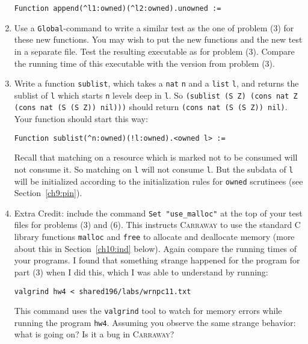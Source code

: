 \documentclass{book}[12pt]
\newcommand{\carraway}[0]{\textsc{Carraway}\xspace}
\begin{document}
\begin{enumerate}
\begin{verbatim}
Function append(^l1:owned)(^l2:owned).unowned :=
\end{verbatim}

\item Use a \texttt{Global}-command to write a similar test as the one
of problem (3) for these new functions.  You may wish to put the new
functions and the new test in a separate file.  Test the resulting
executable as for problem (3).  Compare the running time of this
executable with the version from problem (3).

\item Write a function \texttt{sublist}, which takes a \texttt{nat}
\texttt{n} and a \texttt{list} \texttt{l}, and returns the sublist of
\texttt{l} which starts \texttt{n} levels deep in \texttt{l}.  So
\texttt{(sublist (S Z) (cons nat Z (cons nat (S (S Z)) nil)))} should
return \texttt{(cons nat (S (S Z)) nil)}.  Your function should start
this way:

\begin{verbatim}
Function sublist(^n:owned)(!l:owned).<owned l> :=
\end{verbatim}

\noindent Recall that matching on a resource which is marked not to be
consumed will not consume it.  So matching on \texttt{l} will not
consume \texttt{l}.  But the subdata of \texttt{l} will be initialized
according to the initialization rules for \texttt{owned} scrutinees
(see Section~\ref{ch9:pin}).

\item Extra Credit: include the command \texttt{Set "use\_malloc"} at
the top of your test files for problems (3) and (6).  This instructs
\carraway to use the standard C library functions \texttt{malloc} and
\texttt{free} to allocate and deallocate memory (more about this in
Section~\ref{ch10:ind} below).  Again compare the running times of your
programs.  I found that something strange happened for the program for
part (3) when I did this, which I was able to understand by running:

\begin{verbatim}
valgrind hw4 < shared196/labs/wrnpc11.txt
\end{verbatim}

\noindent This command uses the \texttt{valgrind} tool to watch for
memory errors while running the program \texttt{hw4}.  Assuming
you observe the same strange behavior: what is going on?  Is it
a bug in \carraway?

\end{enumerate}
\end{document}
